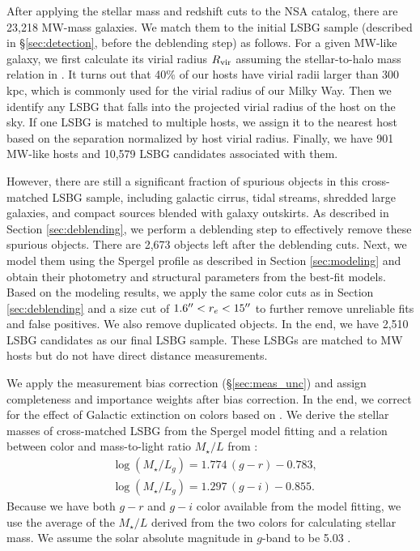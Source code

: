 \documentclass[twocolumn,astrosymb,twocolappendix]{aastex631}
\begin{document}
\begin{CJK*}{UTF8}{gbsn}
After applying the stellar mass and redshift cuts to the NSA catalog, there are 23,218 MW-mass galaxies. We match them to the initial LSBG sample (described in \S \ref{sec:detection}, before the deblending step) as follows. For a given MW-like galaxy, we first calculate its virial radius $R_{\rm vir}$ assuming the stellar-to-halo mass relation in \citet{Behroozi2010}. It turns out that 40\% of our hosts have virial radii larger than 300 kpc, which is commonly used for the virial radius of our Milky Way. Then we identify any LSBG that falls into the projected virial radius of the host on the sky. If one LSBG is matched to multiple hosts, we assign it to the nearest host based on the separation normalized by host virial radius. Finally, we have 901 MW-like hosts and 10,579 LSBG candidates associated with them. 

However, there are still a significant fraction of spurious objects in this cross-matched LSBG sample, including galactic cirrus, tidal streams, shredded large galaxies, and compact sources blended with galaxy outskirts. As described in Section \ref{sec:deblending}, we perform a deblending step to effectively remove these spurious objects. There are 2,673 objects left after the deblending cuts. Next, we model them using the Spergel profile as described in Section \ref{sec:modeling} and obtain their photometry and structural parameters from the best-fit models. Based on the modeling results, we apply the same color cuts as in Section \ref{sec:deblending} and a size cut of $1.6\mbox{$^{\prime\prime}$} < r_e < 15\mbox{$^{\prime\prime}$}$ to further remove unreliable fits and false positives. We also remove duplicated objects. In the end, we have 2,510 LSBG candidates as our final LSBG sample. These LSBGs are matched to MW hosts but do not have direct distance measurements. 

We apply the measurement bias correction (\S \ref{sec:meas_unc}) and assign completeness and importance weights after bias correction. In the end, we correct for the effect of Galactic extinction on colors based on \citet{SFD1998,Schlafly2011}. We derive the stellar masses of cross-matched LSBG from the Spergel model fitting and a relation between color and mass-to-light ratio $M_{\star}/L$ from \citet{Into2013}:
\begin{align*}
&\log \left(M_{\star} / L_{g}\right)=1.774\,(g-r)-0.783, \\
&\log \left(M_{\star} / L_{g}\right)=1.297\,(g-i)-0.855.
\end{align*}
Because we have both $g-r$ and $g-i$ color available from the model fitting, we use the average of the $M_{\star}/L$ derived from the two colors for calculating stellar mass. We assume the solar absolute magnitude in $g$-band to be 5.03 \citep{Willmer2018}. 


\end{CJK*}
\end{document}
